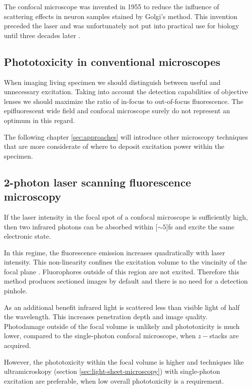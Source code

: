 The confocal microscope was invented in 1955  \citep{Minsky1961,Minsky1988} to reduce the influence of
scattering effects in neuron samples stained by Golgi's method. This
invention preceded the laser and was unfortunately not put into
practical use for biology until three decades later \citep{Amos1987}.
\subsection{Phototoxicity in conventional microscopes}
When imaging living specimen we should distinguish between useful and
unnecessary excitation. Taking into account the detection capabilities
of objective lenses we should maximize the ratio of in-focus to
out-of-focus fluorescence. The epifluorescent wide field and confocal
microscope surely do not represent an optimum in this regard.

The following chapter \ref{sec:approaches} will introduce other
microscopy techniques that are more considerate of where to deposit
excitation power within the specimen.
\subsection{2-photon laser scanning fluorescence microscopy}
\label{sec:2-photon}
If the laser intensity in the focal spot of a confocal microscope is
sufficiently high, then two infrared photons can be absorbed within
\unit[$\sim 5$]{fs} and excite the same electronic state.

In this regime, the fluorescence emission increases quadratically with
laser intensity. This non-linearity confines the excitation volume to
the vincinity of the focal plane \citep{Denk1990}. Fluorophores
outside of this region are not excited. Therefore this method produces
sectioned images by default and there is no need for a detection
pinhole.

As an additional benefit infrared light is scattered less than visible
light of half the wavelength. This increases penetration depth and
image quality. Photodamage outside of the focal volume is unlikely and
phototoxicity is much lower, compared to the single-photon confocal
microscope, when $z-$stacks are acquired.

However, the phototoxicity within the focal volume is higher and
techniques like ultramicroskopy (section
\ref{sec:light-sheet-microscopy}) with single-photon excitation are
preferable, when low overall phototoxicity is a requirement.

